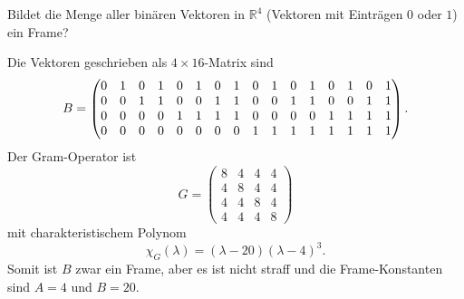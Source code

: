 Bildet die Menge aller binären Vektoren in $\mathbb R^4$ (Vektoren mit
Einträgen $0$ oder $1$) ein Frame?

\begin{loesung}
Die Vektoren geschrieben als $4\times 16$-Matrix sind
\[
\setcounter{MaxMatrixCols}{16}
B
=
\begin{pmatrix}
0&1&0&1&0&1&0&1&0&1&0&1&0&1&0&1\\
0&0&1&1&0&0&1&1&0&0&1&1&0&0&1&1\\
0&0&0&0&1&1&1&1&0&0&0&0&1&1&1&1\\
0&0&0&0&0&0&0&0&1&1&1&1&1&1&1&1
\end{pmatrix}.
\]
Der Gram-Operator ist
\[
G=
\begin{pmatrix}
8&4&4&4\\
4&8&4&4\\
4&4&8&4\\
4&4&4&8
\end{pmatrix}
\]
mit charakteristischem Polynom
\[
\chi_{G}(\lambda)
=
(\lambda-20)(\lambda-4)^3.
\]
Somit ist $B$ zwar ein Frame, aber es ist nicht straff und die
Frame-Konstanten sind $A=4$ und $B=20$.
\end{loesung}


